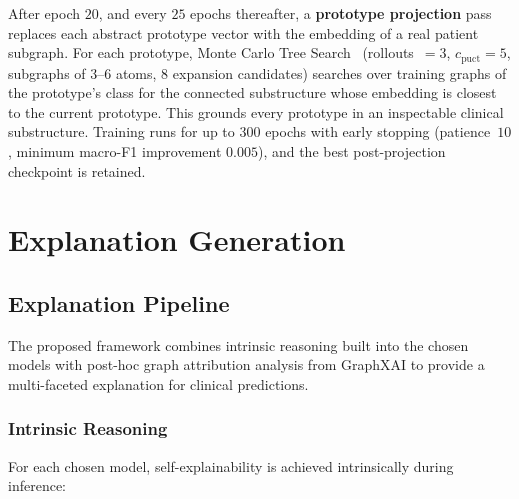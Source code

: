 After epoch $20$, and every $25$ epochs thereafter, a \textbf{prototype
projection} pass replaces each abstract prototype vector with the embedding of a
real patient subgraph. For each prototype, Monte Carlo Tree
Search~\cite{zhang2022protgnn} (rollouts~$=3$, $c_{\text{puct}}=5$, subgraphs of
$3$--$6$ atoms, $8$ expansion candidates) searches over training graphs of the
prototype's class for the connected substructure whose embedding is closest to
the current prototype. This grounds every prototype in an inspectable clinical
substructure. Training runs for up to $300$ epochs with early stopping
(patience~$10$, minimum macro-F1 improvement $0.005$), and the best
post-projection checkpoint is retained.


\section{Explanation Generation}
\subsection{Explanation Pipeline}
The proposed framework combines intrinsic reasoning built into the chosen models with post-hoc graph attribution analysis from GraphXAI to provide a multi-faceted explanation for clinical predictions.

\subsubsection{Intrinsic Reasoning}
For each chosen model, self-explainability is achieved intrinsically during inference:

